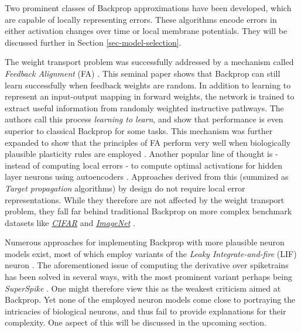 Two prominent classes of Backprop approximations have been developed, which are capable of locally representing errors.
These algorithms encode errors in either activation changes over time or local membrane potentials. They will be
discussed further in Section \ref{sec-model-selection}.\newline


\noindent The weight transport problem was successfully addressed by a mechanism called \textit{Feedback Alignment} (FA)
\citep{Lillicrap2014}. This seminal paper shows that Backprop can still learn successfully when feedback weights are
random. In addition to learning to represent an input-output mapping in forward weights, the network is trained to
extract useful information from randomly weighted instructive pathways. The authors call this process \textit{learning
to learn}, and show that performance is even superior to classical Backprop for some tasks. This mechanism was further
expanded to show that the principles of FA perform very well when biologically plausible plasticity rules are employed
\citep{Liao2016,Zenke2018}. Another popular line of thought is - instead of computing local errors - to compute optimal
activations for hidden layer neurons using autoencoders \citep{Bengio2014,Lee2015,Ahmad2020}. Approaches derived from
this (summized as \textit{Target propagation} algorithms) by design do not require local error representations. While
they therefore are not affected by the weight transport problem, they fall far behind traditional Backprop on more
complex benchmark datasets like \textit{\href{https://www.cs.toronto.edu/~kriz/cifar.html}{CIFAR}} and
\textit{\href{https://www.image-net.org/index.php}{ImageNet}} \citep{Bartunov2018}.\newline

\noindent Numerous approaches for implementing Backprop with more plausible neuron models exist, most of which employ
variants of the \textit{Leaky Integrate-and-fire} (LIF) neuron \citep{Sporea2013,Lee2016,Bengio2017,Lee2020}. The
aforementioned issue of computing the derivative over spiketrains has been solved in several ways, with the most
prominent variant perhaps being \textit{SuperSpike} \citep{Zenke2018}. One might therefore view this as the weakest
criticism aimed at Backprop. Yet none of the employed neuron models come close to portraying the intricacies of
biological neurons, and thus fail to provide explanations for their complexity. One aspect of this will be discussed in
the upcoming section.\newline

